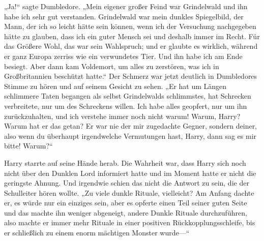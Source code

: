 „Ja!“ sagte Dumbledore. „Mein eigener großer Feind war Grindelwald und ihn habe ich sehr gut verstanden. Grindelwald war mein dunkles Spiegelbild, der Mann, der ich so leicht hätte sein können, wenn ich der Versuchung nachgegeben hätte zu glauben, dass ich ein guter Mensch sei und deshalb immer im Recht. Für das Größere Wohl, das war sein Wahlspruch; und er glaubte es wirklich, während er ganz Europa zerriss wie ein verwundetes Tier. Und ihn habe ich am Ende besiegt. Aber dann kam Voldemort, um alles zu zerstören, was ich in Großbritannien beschützt hatte.“ Der Schmerz war jetzt deutlich in Dumbledores Stimme zu hören und auf seinem Gesicht zu sehen. „Er hat um Längen schlimmere Taten begangen als selbst Grindelwalds schlimmstes, hat Schrecken verbreitete, nur um des Schreckens willen. Ich habe alles geopfert, nur um ihn zurückzuhalten, und ich verstehe immer noch nicht warum! Warum, Harry? Warum hat er das getan? Er war nie der mir zugedachte Gegner, sondern deiner, also wenn du überhaupt irgendwelche Vermutungen hast, Harry, dann sag es mir bitte! Warum?“

Harry starrte auf seine Hände herab. Die Wahrheit war, dass Harry sich noch nicht über den Dunklen Lord informiert hatte und im Moment hatte er nicht die geringste Ahnung. Und irgendwie schien das nicht die Antwort zu sein, die der Schulleiter hören wollte. „Zu viele dunkle Rituale, vielleicht? Am Anfang dachte er, es würde nur ein einziges sein, aber es opferte einen Teil seiner guten Seite und das machte ihn weniger abgeneigt, andere Dunkle Rituale durchzuführen, also machte er immer mehr Rituale in einer positiven Rückkopplungsschleife, bis er schließlich zu einem enorm mächtigen Monster wurde—“


